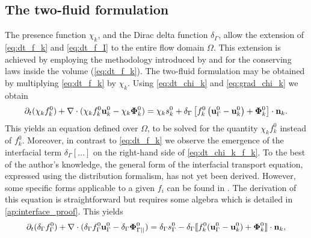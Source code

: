 \subsection{The two-fluid formulation}
The presence function $\chi_k$, and the Dirac delta function $\delta_\Gamma $, allow the extension of \ref{eq:dt_f_k} and \ref{eq:dt_f_I} to the entire flow domain $\Omega$. 
This extension is achieved by employing the methodology introduced by \citet{drew1983mathematical} and \citet{kataoka1986local} for the conserving laws inside the volume (\ref{eq:dt_f_k}).
The two-fluid formulation may be obtained by multiplying \ref{eq:dt_f_k} by $\chi_k$. 
Using \ref{eq:dt_chi_k} and \ref{eq:grad_chi_k} we obtain
\begin{equation}
    \partial_t (\chi_k f_k^0)
    + \mathbf{\nabla}\cdot (
        \chi_k f_k^0 \textbf{u}_k^0
        - \chi_k \mathbf{\Phi}_k^0 
        )
    = 
    \chi_k s_k^0
    + \delta_\Gamma \left[
        f_k^0
        \left(
            \textbf{u}_\Gamma^0
            - \textbf{u}_k^0
        \right)
        + \mathbf{\Phi}_k^0
    \right]
    \cdot \textbf{n}_k.
    \label{eq:dt_chi_k_f_k}
\end{equation}
This yields an equation defined over $\Omega$, to be solved for the quantity $\chi_k f_k^0$ instead of $f_k^0$. 
Moreover, in contrast to \ref{eq:dt_f_k} we observe the emergence of the interfacial term $ \delta_\Gamma [\ldots]$ on the right-hand side of \ref{eq:dt_chi_k_f_k}. 
To the best of the author's knowledge, the general form of the interfacial transport equation, expressed using the distribution formalism, has not yet been derived. However, some specific forms applicable to a given $f_i$ can be found in \citet{marle1982macroscopic, teigen2009}.
The derivation of this equation is straightforward but requires some algebra which is detailed in \ref{ap:interface_proof}. This yields%
\begin{equation}
    \partial_t (\delta_\Gamma f_\Gamma^0)  
    + \mathbf{\nabla}\cdot (
        \delta_\Gamma  f_\Gamma^0 \textbf{u}_\Gamma^0
        - \delta_\Gamma  \mathbf{\Phi}_{\Gamma||}^0 
        )
    = 
    \delta_\Gamma s_\Gamma^0
    - \delta_\Gamma \llbracket 
    f_k^0 (\textbf{u}_\Gamma^0 - \textbf{u}_k^0)
    + \mathbf{\Phi}_k^0 \rrbracket \cdot \textbf{n}_k,
    \label{eq:dt_delta_I_f_I}
\end{equation}
